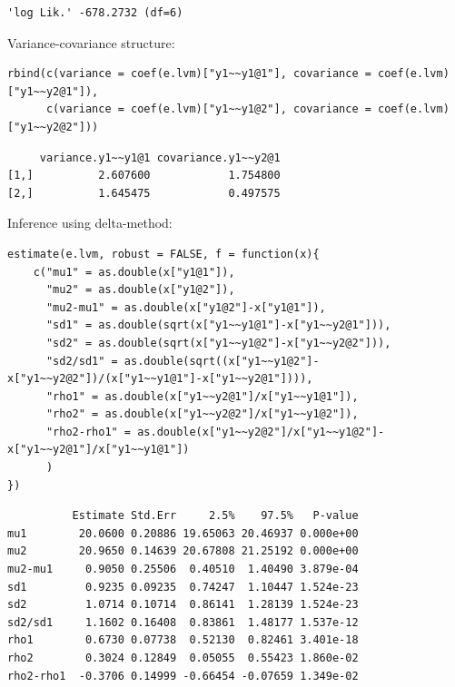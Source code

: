 \documentclass{article}
\begin{document}
\begin{verbatim}
'log Lik.' -678.2732 (df=6)
\end{verbatim}


Variance-covariance structure:
\lstset{language=r,label= ,caption= ,captionpos=b,numbers=none}
\begin{lstlisting}
rbind(c(variance = coef(e.lvm)["y1~~y1@1"], covariance = coef(e.lvm)["y1~~y2@1"]),
      c(variance = coef(e.lvm)["y1~~y1@2"], covariance = coef(e.lvm)["y1~~y2@2"]))
\end{lstlisting}

\begin{verbatim}
     variance.y1~~y1@1 covariance.y1~~y2@1
[1,]          2.607600            1.754800
[2,]          1.645475            0.497575
\end{verbatim}


Inference using delta-method:
\lstset{language=r,label= ,caption= ,captionpos=b,numbers=none}
\begin{lstlisting}
estimate(e.lvm, robust = FALSE, f = function(x){
    c("mu1" = as.double(x["y1@1"]),
      "mu2" = as.double(x["y1@2"]),
      "mu2-mu1" = as.double(x["y1@2"]-x["y1@1"]),
      "sd1" = as.double(sqrt(x["y1~~y1@1"]-x["y1~~y2@1"])),
      "sd2" = as.double(sqrt(x["y1~~y1@2"]-x["y1~~y2@2"])),
      "sd2/sd1" = as.double(sqrt((x["y1~~y1@2"]-x["y1~~y2@2"])/(x["y1~~y1@1"]-x["y1~~y2@1"]))),
      "rho1" = as.double(x["y1~~y2@1"]/x["y1~~y1@1"]),
      "rho2" = as.double(x["y1~~y2@2"]/x["y1~~y1@2"]),
      "rho2-rho1" = as.double(x["y1~~y2@2"]/x["y1~~y1@2"]-x["y1~~y2@1"]/x["y1~~y1@1"])
      )
})
\end{lstlisting}

\begin{verbatim}
          Estimate Std.Err     2.5%    97.5%   P-value
mu1        20.0600 0.20886 19.65063 20.46937 0.000e+00
mu2        20.9650 0.14639 20.67808 21.25192 0.000e+00
mu2-mu1     0.9050 0.25506  0.40510  1.40490 3.879e-04
sd1         0.9235 0.09235  0.74247  1.10447 1.524e-23
sd2         1.0714 0.10714  0.86141  1.28139 1.524e-23
sd2/sd1     1.1602 0.16408  0.83861  1.48177 1.537e-12
rho1        0.6730 0.07738  0.52130  0.82461 3.401e-18
rho2        0.3024 0.12849  0.05055  0.55423 1.860e-02
rho2-rho1  -0.3706 0.14999 -0.66454 -0.07659 1.349e-02
\end{verbatim}
\end{document}

